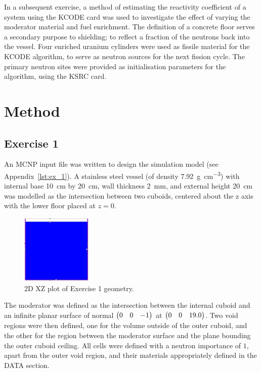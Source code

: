 \documentclass{article}
\begin{document}
In a subsequent exercise, a method of estimating the reactivity coefficient of a system using the KCODE card was used to investigate the effect of varying the moderator material and fuel enrichment. The definition of a concrete floor serves a secondary purpose to shielding; to reflect a fraction of the neutrons back into the vessel. Four enriched uranium cylinders were used as fissile material for the KCODE algorithm, to serve as neutron sources for the next fission cycle. The primary neutron sites were provided as initialisation parameters for the algorithm, using the KSRC card.

\section{Method}
  \subsection{Exercise 1}
    \label{sec:ex_1}
    An MCNP input file was written to design the simulation model (see Appendix~\ref{lst:ex_1}). A stainless steel vessel (of  density \SI{7.92}{\gram\per\cm^3}) with internal base \SI{10}{\cm} by \SI{20}{\cm}, wall thickness \SI{2}{\mm}, and external height \SI{20}{\cm} was modelled as the intersection between two cuboids, centered about the z axis with the lower floor placed at $z=0$.
    \begin{figure}[htb]
      \centering
      \includegraphics[width=0.3\textwidth]{cuboid.png}
      \caption{2D XZ plot of Exercise 1 geometry.}
      \label{fig:ex_1_geometry}
    \end{figure}
    The moderator was defined as the intersection between the internal cuboid and an infinite planar surface of normal $\mqty(0 & 0 & -1)$ at $\mqty(0 & 0 & 19.0)$. Two void regions were then defined, one for the volume outside of the outer cuboid, and the other for the region between the moderator surface and the plane bounding the outer cuboid ceiling.
    All cells were defined with a neutron importance of $1$, apart from the outer void region, and their materials appropriately defined in the DATA section.
\end{document}
